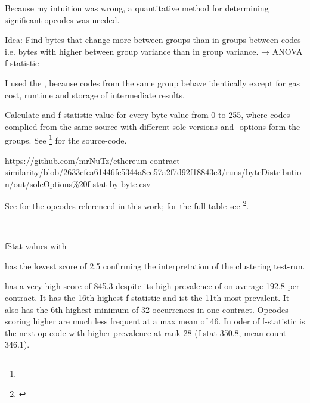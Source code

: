 \documentclass[../main.tex]{subfiles}
\begin{document}
Because my intuition was wrong, a quantitative method for determining significant opcodes was needed.

Idea: Find bytes that change more between groups than in groups between codes i.e. bytes with higher between group variance than in group variance. → ANOVA f-statistic

I used the , because codes from the same group behave identically except for gas cost, runtime and storage of intermediate results.


Calculate and f-statistic value for every byte value from 0 to 255, where codes complied from the same source with different solc-versions and -options form the groups. See \footnote{} for the source-code.

\urldef\urlFstat\url{https://github.com/mrNuTz/ethereum-contract-similarity/blob/2633cfca61446fe5344a8ee57a2f7d92f18843e3/runs/byteDistribution/out/solcOptions%20f-stat-by-byte.csv}

See  for the opcodes referenced in this work; for the full table see \footnote{\bfseries\scriptsize\urlFstat}.

\begin{table}[ht!]
  \centering
  \scriptsize %
  \parbox{5em}{~}
  \caption{fStat values with \n{\solcts}}
  \label{tbl:solcFstat}
\end{table}

 has the lowest score of 2.5 confirming the interpretation of the clustering test-run.

 has a very high score of 845.3 despite its high prevalence of on average 192.8 per contract. It has the 16th highest f-statistic and ist the 11th most prevalent. It also has the 6th highest minimum of 32 occurrences in one contract. Opcodes scoring higher are much less frequent at a max mean of 46. In oder of f-statistic  is the next op-code with higher prevalence at rank 28 (f-stat 350.8, mean count 346.1).
\end{document}
